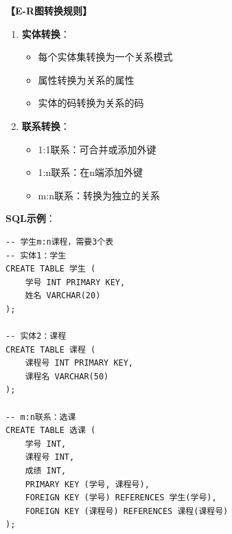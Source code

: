 \documentclass[12pt, a4paper]{article}
\newenvironment{bluebox}[1]{%
  \begin{trivlist}
  \item[\hskip\labelsep \textbf{#1}]
  \setlength{\parskip}{0.5ex}
  \setlength{\itemsep}{0.5ex}
}{%
  \end{trivlist}
  }
\begin{document}
\begin{bluebox}{基本转换规则}
	\textbf{【E-R图转换规则】}

	\begin{enumerate}[leftmargin=*, label=\textbf{\arabic*.}]
		\item \textbf{实体转换}：
		      \begin{itemize}[nosep]
			      \item 每个实体集转换为一个关系模式
			      \item 属性转换为关系的属性
			      \item 实体的码转换为关系的码
		      \end{itemize}

		\item \textbf{联系转换}：
		      \begin{itemize}[nosep]
			      \item 1:1联系：可合并或添加外键
			      \item 1:n联系：在n端添加外键
			      \item m:n联系：转换为独立的关系
		      \end{itemize}
	\end{enumerate}

	\textbf{SQL示例}：
	\begin{verbatim}
-- 学生m:n课程，需要3个表
-- 实体1：学生
CREATE TABLE 学生 (
    学号 INT PRIMARY KEY,
    姓名 VARCHAR(20)
);

-- 实体2：课程
CREATE TABLE 课程 (
    课程号 INT PRIMARY KEY,
    课程名 VARCHAR(50)
);

-- m:n联系：选课
CREATE TABLE 选课 (
    学号 INT,
    课程号 INT,
    成绩 INT,
    PRIMARY KEY (学号, 课程号),
    FOREIGN KEY (学号) REFERENCES 学生(学号),
    FOREIGN KEY (课程号) REFERENCES 课程(课程号)
);
	\end{verbatim}
\end{bluebox}
\end{document}
